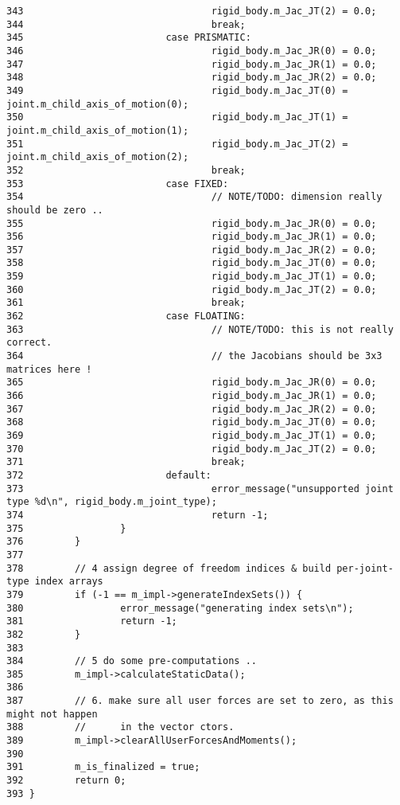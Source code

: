 \begin{Code}
\begin{verbatim}
343                                 rigid_body.m_Jac_JT(2) = 0.0;
344                                 break;
345                         case PRISMATIC:
346                                 rigid_body.m_Jac_JR(0) = 0.0;
347                                 rigid_body.m_Jac_JR(1) = 0.0;
348                                 rigid_body.m_Jac_JR(2) = 0.0;
349                                 rigid_body.m_Jac_JT(0) = joint.m_child_axis_of_motion(0);
350                                 rigid_body.m_Jac_JT(1) = joint.m_child_axis_of_motion(1);
351                                 rigid_body.m_Jac_JT(2) = joint.m_child_axis_of_motion(2);
352                                 break;
353                         case FIXED:
354                                 // NOTE/TODO: dimension really should be zero ..
355                                 rigid_body.m_Jac_JR(0) = 0.0;
356                                 rigid_body.m_Jac_JR(1) = 0.0;
357                                 rigid_body.m_Jac_JR(2) = 0.0;
358                                 rigid_body.m_Jac_JT(0) = 0.0;
359                                 rigid_body.m_Jac_JT(1) = 0.0;
360                                 rigid_body.m_Jac_JT(2) = 0.0;
361                                 break;
362                         case FLOATING:
363                                 // NOTE/TODO: this is not really correct.
364                                 // the Jacobians should be 3x3 matrices here !
365                                 rigid_body.m_Jac_JR(0) = 0.0;
366                                 rigid_body.m_Jac_JR(1) = 0.0;
367                                 rigid_body.m_Jac_JR(2) = 0.0;
368                                 rigid_body.m_Jac_JT(0) = 0.0;
369                                 rigid_body.m_Jac_JT(1) = 0.0;
370                                 rigid_body.m_Jac_JT(2) = 0.0;
371                                 break;
372                         default:
373                                 error_message("unsupported joint type %d\n", rigid_body.m_joint_type);
374                                 return -1;
375                 }
376         }
377 
378         // 4 assign degree of freedom indices & build per-joint-type index arrays
379         if (-1 == m_impl->generateIndexSets()) {
380                 error_message("generating index sets\n");
381                 return -1;
382         }
383 
384         // 5 do some pre-computations ..
385         m_impl->calculateStaticData();
386 
387         // 6. make sure all user forces are set to zero, as this might not happen
388         //      in the vector ctors.
389         m_impl->clearAllUserForcesAndMoments();
390 
391         m_is_finalized = true;
392         return 0;
393 }
\end{verbatim}
\end{Code}




